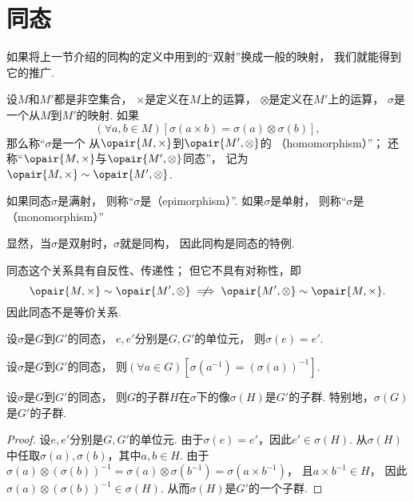 \section{同态}
如果将上一节介绍的同构的定义中用到的“双射”换成一般的映射，
我们就能得到它的推广.

\begin{definition}
设\(M\)和\(M'\)都是非空集合，
\(\times\)是定义在\(M\)上的运算，
\(\otimes\)是定义在\(M'\)上的运算，
\(\sigma\)是一个从\(M\)到\(M'\)的映射.
如果\[
	(\forall a,b \in M)[
		\sigma(a \times b) = \sigma(a) \otimes \sigma(b)
	],
\]
那么称“\(\sigma\)是一个%
从\(\opair{M,\times}\)到\(\opair{M',\otimes}\)的%
（homomorphism）”；
还称“\(\opair{M,\times}\)与\(\opair{M',\otimes}\)同态”，
记为\(\opair{M,\times} \sim \opair{M',\otimes}\).
\end{definition}

如果同态\(\sigma\)是满射，
则称“\(\sigma\)是（epimorphism）”.
如果\(\sigma\)是单射，
则称“\(\sigma\)是（monomorphism）”

显然，当\(\sigma\)是双射时，\(\sigma\)就是同构，
因此同构是同态的特例.

同态这个关系具有自反性、传递性；
但它不具有对称性，即\[
	\opair{M,\times}\sim\opair{M',\otimes}
	\notimplies
	\opair{M',\otimes}\sim\opair{M,\times}.
\]
因此同态不是等价关系.

\begin{property}
设\(\sigma\)是\(G\)到\(G'\)的同态，
\(e,e'\)分别是\(G,G'\)的单位元，
则\(\sigma(e)=e'\).
\end{property}

\begin{property}
设\(\sigma\)是\(G\)到\(G'\)的同态，
则\((\forall a \in G)[\sigma(a^{-1})=(\sigma(a))^{-1}]\).
\end{property}

\begin{property}
设\(\sigma\)是\(G\)到\(G'\)的同态，
则\(G\)的子群\(H\)在\(\sigma\)下的像\(\sigma(H)\)是\(G'\)的子群.
特别地，\(\sigma(G)\)是\(G'\)的子群.
\begin{proof}
设\(e,e'\)分别是\(G,G'\)的单位元.
由于\(\sigma(e)=e'\)，因此\(e'\in\sigma(H)\).
从\(\sigma(H)\)中任取\(\sigma(a),\sigma(b)\)，其中\(a,b\in H\).
由于\(\sigma(a) \otimes (\sigma(b))^{-1}
= \sigma(a) \otimes \sigma(b^{-1})
= \sigma(a \times b^{-1})\)，
且\(a \times b^{-1} \in H\)，
因此\(\sigma(a) \otimes (\sigma(b))^{-1} \in \sigma(H)\).
从而\(\sigma(H)\)是\(G'\)的一个子群.
\end{proof}
\end{property}

